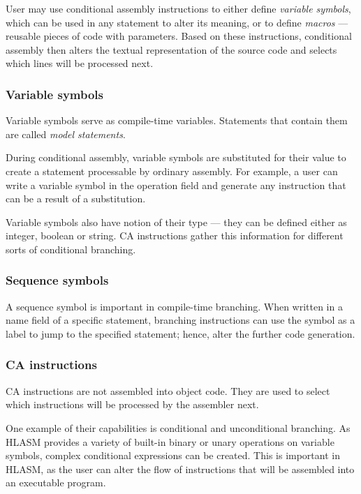 User may use conditional assembly instructions to either define \emph{variable symbols}, which can be used in any statement to alter its meaning, or to define \emph{macros} --- reusable pieces of code with parameters. Based on these instructions, conditional assembly then alters the textual representation of the source code and selects which lines will be processed next.

\subsubsection{Variable symbols}
\label{var_sym}
Variable symbols serve as compile-time variables. Statements that contain them are called \emph{model statements}.

During conditional assembly, variable symbols are substituted for their value to create a statement processable by ordinary assembly. For example, a user can write a variable symbol in the operation field and generate any instruction that can be a result of a substitution.

Variable symbols also have notion of their type --- they can be defined either as integer, boolean or string. CA instructions gather this information for different sorts of conditional branching.

\subsubsection{Sequence symbols}

A sequence symbol is important in compile-time branching. When written in a name field of a specific statement, branching instructions can use the symbol as a label to jump to the specified statement; hence, alter the further code generation.   

\subsubsection{CA instructions}
\label{ca_instr}

CA instructions are not assembled into object code. They are used to select which instructions will be processed by the assembler next.

One example of their capabilities is conditional and unconditional branching. As HLASM provides a variety of built-in binary or unary operations on variable symbols, complex conditional expressions can be created. This is important in HLASM, as the user can alter the flow of instructions that will be assembled into an executable program.

